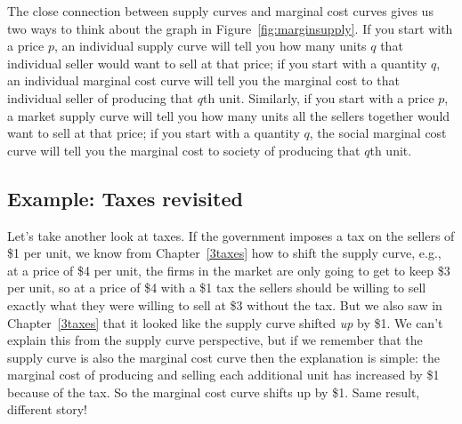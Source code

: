 The close connection between supply curves and marginal cost curves gives us two ways to think about the graph in Figure~\ref{fig:marginsupply}. If you start with a price $p$, an individual supply curve will tell you how many units $q$ that individual seller would want to sell at that price; if you start with a quantity $q$, an individual marginal cost curve will tell you the marginal cost to that individual seller of producing that $q$th unit. Similarly, if you start with a price $p$, a market supply curve will tell you how many units all the sellers together would want to sell at that price; if you start with a quantity $q$, the social marginal cost curve will tell you the marginal cost to society of producing that $q$th unit.


\subsection*{Example: Taxes revisited}

Let's take another look at taxes. If the government imposes a tax on the sellers of \$1 per unit, we know from Chapter~\ref{3taxes} how to shift the supply curve, e.g., at a price of \$4 per unit, the firms in the market are only going to get to keep \$3 per unit, so at a price of \$4 with a \$1 tax the sellers should be willing to sell exactly what they were willing to sell at \$3 without the tax. But we also saw in Chapter~\ref{3taxes} that it looked like the supply curve shifted \emph{up} by \$1. We can't explain this from the supply curve perspective, but if we remember that the supply curve is also the marginal cost curve then the explanation is simple: the marginal cost of producing and selling each additional unit has increased by \$1 because of the tax. So the marginal cost curve shifts up by \$1. Same result, different story!



